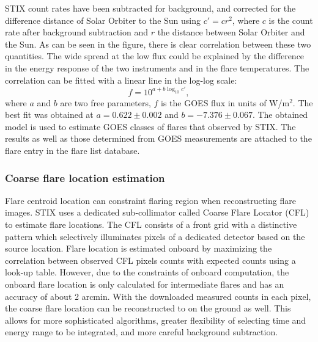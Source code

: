 \documentclass[referee]{aa} %
\begin{document}
STIX count rates  have been subtracted for background,  and corrected for 
the difference distance of Solar Orbiter to the Sun using $c'=c r^2$, where $c$ is the count rate after background subtraction
 and $r$ the distance between Solar Orbiter and the Sun. 
As can be seen in the figure, there is clear correlation between
these two quantities.  The wide spread at the low flux could be explained by the difference in 
the energy response of the two instruments and in the flare temperatures.
The correlation can be fitted with a linear line in the log-log scale: 
\begin{equation}
f=10^{a+b\log_{10} c'}, 
\label{eq:goes-stix}
\end{equation}
where $a$ and $b$ are two free parameters, $f$ is the GOES flux  in units of W/m$^2$.
 The best fit was obtained at $a=0.622\pm 0.002$ and $b=-7.376\pm0.067$.
The obtained model is used to estimate  GOES classes 
 of flares that observed by STIX. 
The results as well as those determined from GOES measurements
are attached to  the flare entry in the flare list database. 
\subsubsection{Coarse flare location estimation}
Flare centroid location can constraint flaring region when reconstructing flare images.
STIX uses a dedicated sub-collimator called Coarse Flare Locator (CFL) to estimate flare locations.
The CFL consists of a front grid with
a distinctive pattern which selectively illuminates pixels of a 
dedicated detector based on the source location.
Flare location is estimated onboard by maximizing the correlation between observed CFL pixels counts 
with expected counts using a look-up table. 
However, due to the constraints of onboard computation, the onboard flare location is  only calculated for intermediate flares 
and has an accuracy of about 2 arcmin. 
With the downloaded measured counts  in each pixel,
the coarse flare location can be reconstructed to on the ground as well. 
This allows for more sophisticated algorithms, greater flexibility of selecting time and energy 
range to be integrated, and more careful background subtraction.
\end{document}
